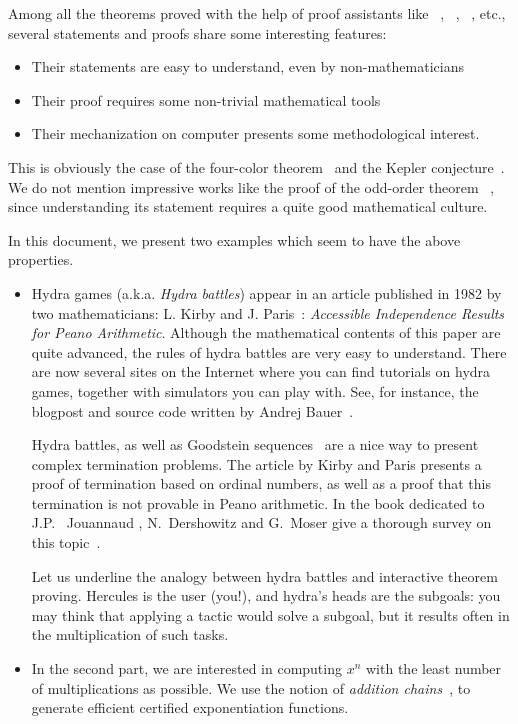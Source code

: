 \documentclass[a4paper]{book}
\begin{document}
Among all the theorems proved with the help of proof assistants like \coq{}~\cite{Coq,BC04}, \hol{}~\cite{HOL}, \isabelle{}~\cite{isabelle},  etc.,
several statements and proofs  share some interesting features:
\begin{itemize}
\item Their statements are easy to understand, even by non-mathematicians
\item Their proof requires some non-trivial mathematical tools
\item Their mechanization on computer presents some methodological interest.
\end{itemize}






This is obviously the case of the four-color theorem~\cite{fourcolors}  and the Kepler conjecture~\cite{flyspeck2015}. We do not mention impressive works like the proof of the odd-order theorem ~\cite{oddorderthm}, since understanding its statement requires a quite good mathematical culture.


In this document, we present two examples which seem to have the above properties.

\begin{itemize}
\item Hydra games (a.k.a. \emph{Hydra battles}) appear in an article published in 1982 by two mathematicians:
L. Kirby and J. Paris~\cite{KP82}: \emph{Accessible Independence Results for Peano Arithmetic}. 
Although the mathematical contents of this 
paper are quite advanced, the rules of hydra battles are very easy to understand. There are now several sites on the Internet where you can find tutorials on hydra games, together with simulators you can play with. See, for instance, the blogpost and source code written by Andrej Bauer~\cite{bauer2008,BauerHydra}.



Hydra battles, as well as Goodstein sequences~\cite{goodstein_1944, KP82}
are a nice way to present complex termination problems.
The article by Kirby and Paris presents a proof of termination
based on ordinal numbers, as well as a proof that this termination is not
provable in Peano arithmetic. In the book dedicated to 
J.P. ~Jouannaud \cite{HommageJPJ}, N.~Dershowitz and G.~Moser  give a thorough survey on this topic~\cite{Dershowitz2007}.

Let us underline the analogy between hydra battles and interactive theorem proving. Hercules is the user (you!), and hydra's heads are the subgoals: you may think that applying a tactic would solve a subgoal, but it results often in the multiplication of such tasks.

\item In the second part, we are interested in computing $x^n$ with the least number of multiplications as possible. We use the notion of \emph{addition chains}~\cite{brauer1939,DBLP:journals/ipl/BerstelB87}, to generate efficient certified exponentiation functions.
\end{itemize}
\end{document}
